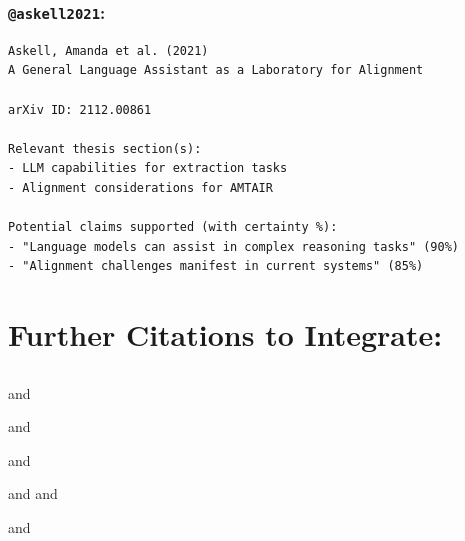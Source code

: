 \documentclass[
  11pt,
  letterpaper,
]{book}
\begin{document}
\subsubsection*{\texorpdfstring{\texttt{@askell2021}:
\textcite{askell2021}}{@askell2021: @askell2021}}\label{askell2021-askell2021}

\begin{verbatim}
Askell, Amanda et al. (2021)
A General Language Assistant as a Laboratory for Alignment

arXiv ID: 2112.00861

Relevant thesis section(s):
- LLM capabilities for extraction tasks
- Alignment considerations for AMTAIR

Potential claims supported (with certainty %):
- "Language models can assist in complex reasoning tasks" (90%)
- "Alignment challenges manifest in current systems" (85%)
\end{verbatim}

\section*{Further Citations to
Integrate:}\label{further-citations-to-integrate}


\subsection*{\texorpdfstring{\textcite{growiec2024}}{@growiec2024}}\label{growiec2024}

\textcite{clarke2022}

\textcite{drexler2019} and \textcite{drexler2019a}

\textcite{brundage2018} and \textcite{brundage2018a}

\textcite{kumar2019} and \textcite{kumar2019a}

\textcite{carlsmith2021} and \textcite{carlsmith2022} and
\textcite{carlsmith2024}

\textcite{hendrycks2021} and \textcite{hendrycks2021a}

\textcite{wilson2023}

\textcite{kilian2023}

\textcite{kulveit2025}
\end{document}
